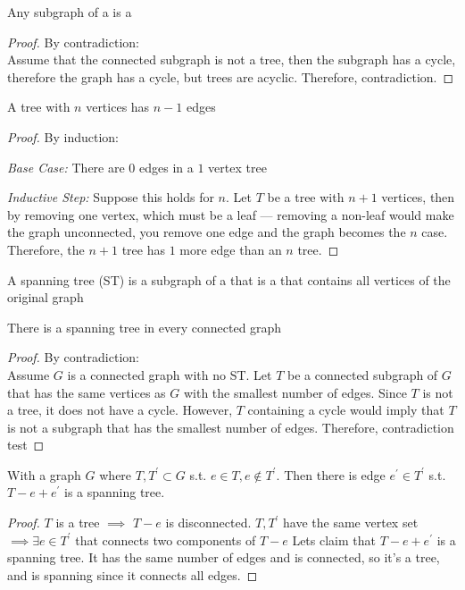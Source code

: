 \begin{lemma}
	Any  subgraph of a  is a  
\end{lemma}
\begin{proof}
	By contradiction: \\
	Assume that the connected subgraph is not a tree, then the subgraph has a cycle, therefore the graph has a cycle, but trees are acyclic. Therefore, contradiction.
\end{proof}

\begin{lemma}
	A tree with \(n\) vertices has \(n-1\) edges
\end{lemma}
\begin{proof}
	By induction:
	
	\emph{Base Case:} There are \(0\) edges in a \(1\) vertex tree

	\emph{Inductive Step:} Suppose this holds for \(n\).
	Let \(T\) be a tree with \(n+1\) vertices, then by removing one vertex, which must be a leaf — removing a non-leaf would make the graph unconnected, you remove one edge and the graph becomes the \(n\) case.
	Therefore, the \(n+1\) tree has \(1\) more edge than an \(n\) tree.
\end{proof}

\begin{definition}
	\label{def:spanning tree}
	A spanning tree (ST) is a subgraph of a  that is a  that contains all vertices of the original graph
\end{definition}

\begin{lemma}
	There is a spanning tree in every connected graph
\end{lemma}
\begin{proof}
	By contradiction: \\
	Assume \(G\) is a connected graph with no ST.
	Let \(T\) be a connected subgraph of \(G\)  that has the same vertices as \(G\) with the smallest number of edges. Since \(T\) is not a tree, it does not have a cycle. However, \(T\) containing a cycle would imply that \(T\) is not a subgraph that has the smallest number of edges.
	Therefore, contradiction test 
\end{proof}

\begin{proposition}
    With a graph \(G\) where \(T, T^\prime \subset G\) s.t. \(e \in T, e \notin T^\prime\). Then there is edge \(e^\prime \in T^\prime \) s.t. \(T - e + e^\prime\)  is a spanning tree.
\end{proposition}
\begin{proof}
    \(T\) is a tree \(\implies\) \(T - e\) is disconnected. \(T, T^\prime\) have the same vertex set \(\implies \exists e \in T^\prime\) that connects two components of \(T - e\) Lets claim that \(T - e + e^\prime\) is a spanning tree. It has the same number of edges and is connected, so it's a tree, and is spanning since it connects all edges. 
\end{proof}
